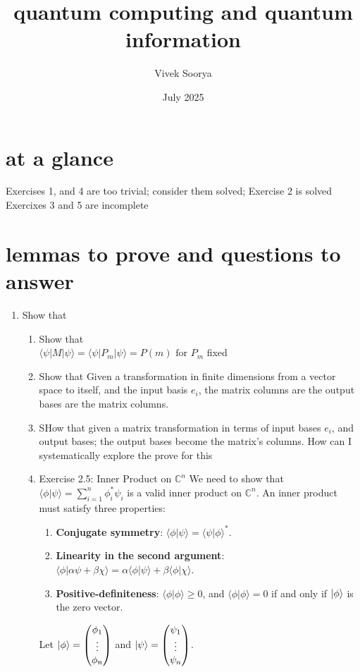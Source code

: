 \documentclass{article}
\title{quantum computing and quantum information}
\author{Vivek Soorya}
\date{July 2025}
\begin{document}
\maketitle
\section{at a glance}
Exercises 1, and 4 are too trivial; consider them solved;
Exercise 2 is solved
Exercixes 3 and 5 are incomplete





\section{lemmas to prove and questions to answer}
\begin{enumerate}
    \item Show that
    \begin{enumerate}
        \item Show that \\
        $\langle\psi|M|\psi\rangle = \langle\psi|P_m|\psi\rangle = P(m) \text{ for } P_m $ 
        fixed  
        \item Show that Given a transformation in finite dimensions from a vector space to itself, and the input basis $e_i$, the matrix columns are the output bases are the matrix columns.
        \item SHow that given a matrix transformation in terms of input bases $e_i$, and output bases; the output bases become the matrix's columns. How can I systematically explore the prove for this
        \item{Exercise 2.5: Inner Product on $\mathbb{C}^n$}
    We need to show that $\langle \phi | \psi \rangle = \sum_{i=1}^n \phi_i^* \psi_i$ is a valid inner product on $\mathbb{C}^n$. An inner product must satisfy three properties:
    \begin{enumerate}
        \item \textbf{Conjugate symmetry}: $\langle \phi | \psi \rangle = \langle \psi | \phi \rangle^*$.
        \item \textbf{Linearity in the second argument}: $\langle \phi | \alpha \psi + \beta \chi \rangle = \alpha \langle \phi | \psi \rangle + \beta \langle \phi | \chi \rangle$.
        \item \textbf{Positive-definiteness}: $\langle \phi | \phi \rangle \ge 0$, and $\langle \phi | \phi \rangle = 0$ if and only if $\ket{\phi}$ is the zero vector.
    \end{enumerate}
    Let $\ket{\phi} = \begin{pmatrix} \phi_1 \\ \vdots \\ \phi_n \end{pmatrix}$ and $\ket{\psi} = \begin{pmatrix} \psi_1 \\ \vdots \\ \psi_n \end{pmatrix}$.


\end{enumerate}
\end{enumerate}
\end{document}
